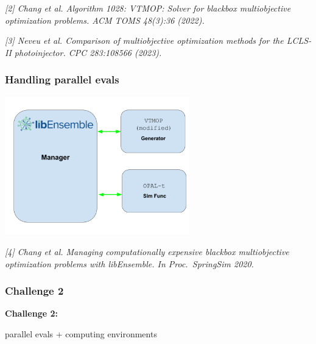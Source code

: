 \documentclass[aspectratio=169]{beamer}
\begin{document}
\begin{frame}
\begin{columns}
\begin{column}{.4\textwidth}
\end{column}
\end{columns}

\vfill

{\tiny\it
[2] Chang et al.
Algorithm 1028: VTMOP: Solver for blackbox multiobjective optimization problems.
{\sl ACM TOMS 48(3):36 (2022).}\\
}

\medskip

{\tiny\it
[3] Neveu et al.
Comparison of multiobjective optimization methods for the LCLS-II photoinjector.
{\sl CPC 283:108566 (2023).}\\
}

\end{frame}

\begin{frame}\frametitle{Handling parallel evals}

\begin{center}
\includegraphics[width=0.6\textwidth]{vtmop_libe_diagram.png}\\
\end{center}

\vfill

{\tiny\it
[4] Chang et al.
Managing computationally expensive blackbox multiobjective optimization
problems with libEnsemble.
{\sl In Proc.\ SpringSim 2020.}\\
}

\end{frame}

\begin{frame}\frametitle{Challenge 2}
\vfill
\begin{center}
{\Huge \bf
Challenge 2:\\

\bigskip

parallel evals + computing environments
}
\end{center}
\vfill
\end{frame}
\end{document}

